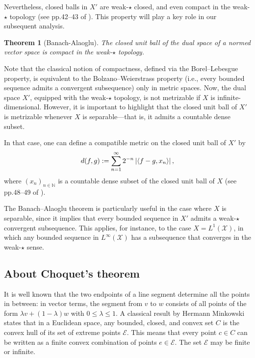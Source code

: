 \documentclass[a4paper, 11pt]{article}
\newtheorem{thm}{Theorem}
\theoremstyle{definition}
\newcommand{\cX}{{\mathcal{X}}}
\begin{document}
{Nevertheless, closed balls in \({X}'\) are weak-$\star$ closed, and even compact in the weak-$\star$ topology (see pp.42–43 of \cite{Bre83}). This property will play a key role in our subsequent analysis. 

\begin{thm}[Banach-Alaoglu]{\label{th: BanAla}}
 The closed unit ball of the dual space of a normed vector space is compact in the weak-$\star$ topology. 
\end{thm}

Note that the classical notion of compactness, defined via the Borel–Lebesgue property, is equivalent to the Bolzano–Weierstrass property (i.e., every bounded sequence admits a convergent subsequence) only in metric spaces. Now, the dual space \({X}'\), equipped with the weak-$\star$ topology, is not metrizable if \({X}\) is infinite-dimensional. However, it is important to highlight that the closed unit ball of \({X}'\) is metrizable whenever \({X}\) is separable—that is, it admits a countable dense subset.

In that case, one can define a compatible metric on the closed unit ball of \({X}'\) by
\begin{equation}{\label{eq: d ball}}
 d(f, g) := \sum_{n = 1}^\infty 2^{-n} \left|\langle f - g, x_n \rangle\right|,   
\end{equation}
where \((x_n)_{n \in \mathbb{N}}\) is a countable dense subset of the closed unit ball of \({X}\) (see pp.48–49 of \cite{Bre83}).

The Banach–Alaoglu theorem is particularly useful in the case where \({X}\) is separable, since it implies that every bounded sequence in \({X}'\) admits a weak-$\star$ convergent subsequence. This applies, for instance, to the case \({X} = L^1(\cX)\), in which any bounded sequence in \(L^\infty(\cX)\) has a subsequence that converges in the weak-$\star$ sense.


\subsection{About Choquet's theorem}
It is well known that the two endpoints of a line segment determine all the points in between: in vector terms, the segment from \( v \) to \( w \) consists of all points of the form \( \lambda v + (1 - \lambda) w \) with \( 0 \leq \lambda \leq 1 \). A classical result by Hermann Minkowski states that in a Euclidean space, any bounded, closed, and convex set \( C \) is the convex hull of its set of extreme points \( \mathcal{E} \). This means that every point \( c \in C \) can be written as a finite convex combination of points \( e \in \mathcal{E} \). The set \( \mathcal{E} \) may be finite or infinite.

}
\end{document}
